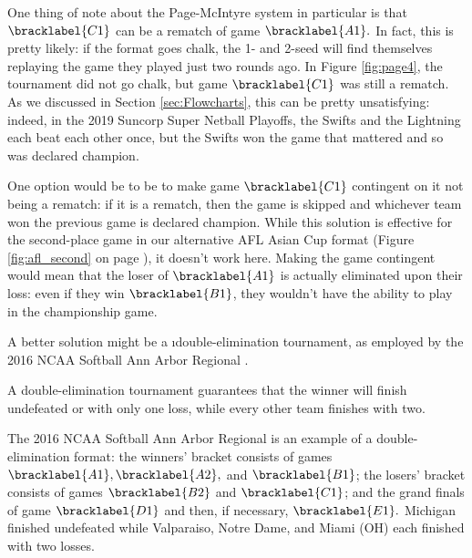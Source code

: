 {    

    One thing of note about the Page-McIntyre system in particular is that $\bracklabel{C1}$ can be a rematch of game $\bracklabel{A1}.$ In fact, this is pretty likely: if the format goes chalk, the 1- and 2-seed will find themselves replaying the game they played just two rounds ago. In Figure \ref{fig:page4}, the tournament did not go chalk, but game $\bracklabel{C1}$ was still a rematch. As we discussed in Section \ref{sec:Flowcharts}, this can be pretty unsatisfying: indeed, in the 2019 Suncorp Super Netball Playoffs, the Swifts and the Lightning each beat each other once, but the Swifts won the game that mattered and so was declared champion. 
    
    One option would be to be to make game $\bracklabel{C1}$ contingent on it not being a rematch: if it is a rematch, then the game is skipped and whichever team won the previous game is declared champion. While this solution is effective for the second-place game in our alternative AFL Asian Cup format (Figure \ref{fig:afl_second} on page \pageref{fig:afl_second}), it doesn't work here. Making the game contingent would mean that the loser of $\bracklabel{A1}$ is actually eliminated upon their loss: even if they win $\bracklabel{B1}$, they wouldn't have the ability to play in the championship game.

    A better solution might be a \i{double-elimination tournament}, as employed by the 2016 NCAA Softball Ann Arbor Regional \cite{wiki_soft}.



    A double-elimination tournament guarantees that the winner will finish undefeated or with only one loss, while every other team finishes with two.

    The 2016 NCAA Softball Ann Arbor Regional is an example of a double-elimination format: the winners' bracket consists of games $\bracklabel{A1}, \bracklabel{A2},$ and $\bracklabel{B1}$; the losers' bracket consists of games $\bracklabel{B2}$ and $\bracklabel{C1}$; and the grand finals of game $\bracklabel{D1}$ and then, if necessary, $\bracklabel{E1}.$ Michigan finished undefeated while Valparaiso, Notre Dame, and Miami (OH) each finished with two losses.

}
